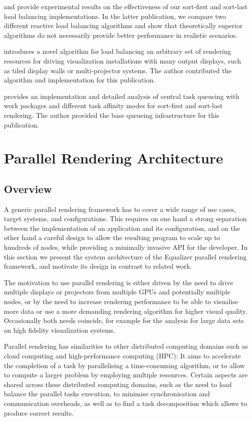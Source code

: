 \cite{EMP:09} and \cite{ESP:18} provide experimental results on the
effectiveness of our sort-first and sort-last load balancing implementations.
In the latter publication, we compare two different reactive load balancing
algorithms and show that theoretically superior algorithms do not necessarily
provide better performance in realistic scenarios.

\cite{EEP:11} introduces a novel algorithm for load balancing an arbitrary set
of rendering resources for driving visualization installations with many output
displays, such as tiled display walls or multi-projector systems. The author
contributed the algorithm and implementation for this publication.

\cite{SPEP:16} provides an implementation and detailed analysis of central task
queueing with work packages and different task affinity modes for sort-first and
sort-last rendering. The author provided the   base queueing infrastructure for
this publication.

\chapter{Parallel Rendering Architecture}\label{sArchitecture}

\section{Overview}
A generic parallel rendering framework has to cover a wide range of use cases,
target systems, and configurations. This requires on one hand a strong
separation between the implementation of an application and its configuration,
and on the other hand a careful design to allow the resulting program to scale
up to hundreds of nodes, while providing a minimally invasive API for the
developer. In this section we present the system architecture of the Equalizer
parallel rendering framework, and motivate its design in contrast to related
work.

The motivation to use parallel rendering is either driven by the need to drive
multiple displays or projectors from multiple GPUs and potentially multiple
nodes, or by the need to increase rendering performance to be able to visualise
more data or use a more demanding rendering algorithm for higher visual quality.
Occasionally both needs coincide, for example for the analysis for large data
sets on high fidelity visualization systems.

Parallel rendering has similarities to other distributed computing domains such
as cloud computing and high-performance computing (HPC): It aims to accelerate
the completion of a task by parallelising a time-consuming algorithm, or to
allow to compute a larger problem by employing multiple resources. Certain
aspects are shared across these distributed computing domains, such as the need
to load balance the parallel tasks execution, to minimise synchronisation and
communication overheads, as well as to find a task decomposition which allows
to produce correct results.

